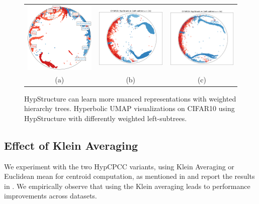 \begin{figure}[ht]
\centering
\begin{tabular}{ccc}
\includegraphics[width=.19\textwidth]{figures/hypstructure_cifar10_centers_main_1.png}&
\includegraphics[width=.25\textwidth]{figures/hypstructure_poincare_disk_cifar10_weights2x.png} & \includegraphics[width=.25\textwidth]{figures/hypstructure_poincare_disk_cifar10_weights4x.png}\\
{ (a)}&{ (b) } & {(c)} 
\end{tabular}
\caption{HypStructure can learn more nuanced representations with weighted hierarchy trees. Hyperbolic UMAP visualizations on CIFAR10 using HypStructure with differently weighted left-subtrees.}
\label{fig:rebuttal_viz_4}
\end{figure}

\subsection{Effect of Klein Averaging}
We experiment with the two HypCPCC variants, using Klein Averaging or Euclidean mean for centroid computation, as mentioned in  and report the results in . We empirically observe that using the Klein averaging leads to performance improvements across datasets. 

\begin{table}[ht]
\centering
{}
\vspace{0.4cm}
\caption{Fine accuracy comparison between Euclidean and Klein centroid computation methods in HypCPCC on CIFAR10, CIFAR100, and ImageNet100 datasets.}
\label{tab:euc_vs_klein}
\end{table}



